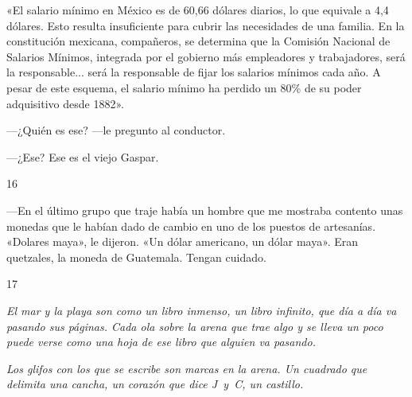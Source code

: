 \documentclass[12pt,twoside,openright,a5paper]{book}
\begin{document}
«El salario mínimo en México es de 60,66 dólares diarios, lo que equivale
a 4,4 dólares. Esto resulta insuficiente para cubrir las necesidades de una
familia. En la constitución mexicana, compañeros, se determina que la 
Comisión Nacional de Salarios
Mínimos, integrada por el gobierno más empleadores y trabajadores, será la
responsable... será la responsable de fijar los salarios mínimos cada
año. A pesar de este esquema, el salario mínimo ha perdido un 80\% de su
poder adquisitivo desde 1882».

---¿Quién es ese? ---le pregunto al conductor.

---¿Ese? Ese es el viejo Gaspar.


\vspace{0.5cm}

\hrulefill \hspace{0.1cm}\decofourleft\hspace{0.2cm} 16 \hspace{0.2cm}\decofourright \hspace{0.1cm}\hrulefill

\nopagebreak

\vspace{0.5cm}

\nopagebreak

---En el último grupo que traje había un hombre que me mostraba contento
unas monedas que le habían dado de cambio en uno de los puestos de
artesanías. «Dolares maya», le dijeron. «Un dólar americano, un dólar maya». Eran
quetzales, la moneda de Guatemala. Tengan cuidado.

\vspace{0.5cm}

\hrulefill \hspace{0.1cm}\decofourleft\hspace{0.2cm} 17 \hspace{0.2cm}\decofourright \hspace{0.1cm}\hrulefill

\nopagebreak

\vspace{0.5cm}

\nopagebreak

\emph{El mar y la playa son como un libro inmenso, un libro infinito, que día
a día va pasando sus páginas. Cada ola sobre la arena que trae algo y se
lleva un poco puede verse como una hoja de ese libro que alguien va pasando.}

\emph{Los glifos con los que se escribe son marcas en la arena. Un cuadrado que
delimita una cancha, un corazón que dice \mbox{J y C}, un castillo.}
\end{document}
